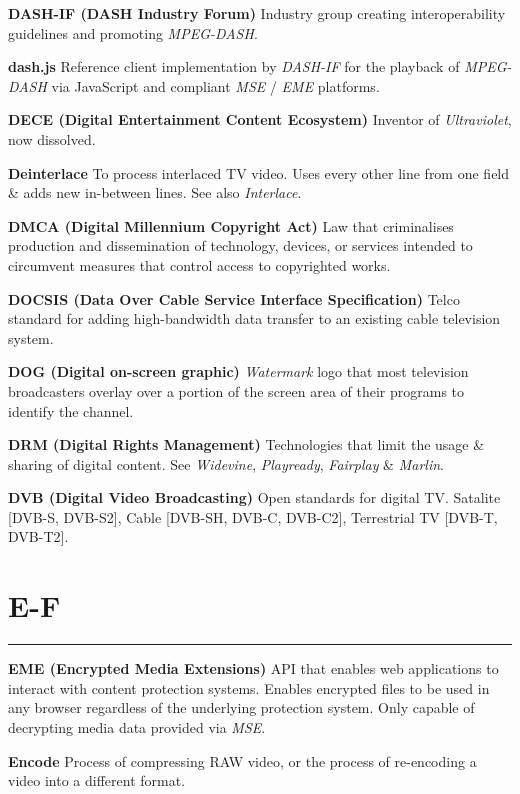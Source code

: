 \smallskip
\textbf{DASH-IF (DASH Industry Forum)}
Industry group creating interoperability guidelines and promoting \textit{MPEG-DASH}.

\smallskip
\textbf{dash.js}
Reference client implementation by \textit{DASH-IF} for the playback of \textit{MPEG-DASH} via JavaScript and compliant \textit{MSE} / \textit{EME} platforms.

\smallskip
\textbf{DECE (Digital Entertainment Content Ecosystem)}
Inventor of \textit{Ultraviolet}, now dissolved.

\smallskip
\textbf{Deinterlace}
To process interlaced TV video. Uses every other line from one field \& adds new in-between lines. See also \textit{Interlace}.

\smallskip
\textbf{DMCA (Digital Millennium Copyright Act)}
Law that criminalises production and dissemination of technology, devices, or services intended to circumvent measures that control access to copyrighted works.

\smallskip
\textbf{DOCSIS (Data Over Cable Service Interface Specification)}
Telco standard for adding high-bandwidth data transfer to an existing cable television system.

\smallskip
\textbf{DOG (Digital on-screen graphic)}
\textit{Watermark} logo that most television broadcasters overlay over a portion of the screen area of their programs to identify the channel.

\smallskip
\textbf{DRM (Digital Rights Management)}
Technologies that limit the usage \& sharing of digital content.  See \textit{Widevine}, \textit{Playready}, \textit{Fairplay} \& \textit{Marlin}.

\smallskip
\textbf{DVB (Digital Video Broadcasting)}
Open standards for digital TV.  Satalite [DVB-S, DVB-S2], Cable [DVB-SH, DVB-C, DVB-C2], Terrestrial TV [DVB-T, DVB-T2].


\section{E-F}
\hrule

\medskip
\textbf{EME (Encrypted Media Extensions)}
API that enables web applications to interact with content protection systems. Enables encrypted files to be used in any browser regardless of the underlying protection system. Only capable of decrypting media data provided via \textit{MSE}.

\smallskip
\textbf{Encode}
Process of compressing RAW video, or the process of re-encoding a video into a different format.

